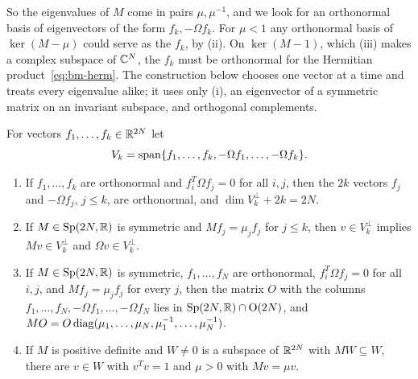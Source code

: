 \begin{vetdenv}
So the eigenvalues of $M$ come in pairs $\mu,\mu^{-1}$, and we look for an orthonormal basis of eigenvectors of the
form $f_k,-\Omega f_k$. For $\mu<1$ any orthonormal basis of $\ker(M-\mu)$ could serve as the $f_k$, by (ii). On
$\ker(M-1)$, which (iii) makes a complex subspace of $\mathbb C^N$, the $f_k$ must be orthonormal for the Hermitian
product~\eqref{eq:bm-herm}. The construction below chooses one vector at a time and treats every eigenvalue
alike; it uses only (i), an eigenvector of a symmetric matrix on an invariant subspace, and orthogonal complements.

\begin{lemma}\label{lem:bm-family}
For vectors $f_1,\ldots,f_k\in\mathbb R^{2N}$ let
\[
 V_k=\operatorname{span}\{f_1,\ldots,f_k,-\Omega f_1,\ldots,-\Omega f_k\}.
\]
\begin{enumerate}
\item[(a)] If $f_1,\ldots,f_k$ are orthonormal and $f_i^T\Omega f_j=0$ for all $i,j$, then the $2k$ vectors $f_j$ and
$-\Omega f_j$, $j\le k$, are orthonormal, and $\dim V_k^\perp+2k=2N$.
\item[(b)] If $M\in\mathrm{Sp}(2N,\mathbb R)$ is symmetric and $Mf_j=\mu_jf_j$ for $j\le k$, then $v\in V_k^\perp$ implies $Mv\in V_k^\perp$
and $\Omega v\in V_k^\perp$.
\item[(c)] If $M\in\mathrm{Sp}(2N,\mathbb R)$ is symmetric, $f_1,\ldots,f_N$ are orthonormal, $f_i^T\Omega f_j=0$ for all $i,j$, and
$Mf_j=\mu_jf_j$ for every $j$, then the matrix $O$ with the columns $f_1,\ldots,f_N,-\Omega f_1,\ldots,-\Omega f_N$ lies
in $\mathrm{Sp}(2N,\mathbb R)\cap\mathrm{O}(2N)$, and $MO=O\operatorname{diag}(\mu_1,\ldots,\mu_N,\mu_1^{-1},\ldots,\mu_N^{-1})$.
\item[(d)] If $M$ is positive definite and $W\ne0$ is a subspace of $\mathbb R^{2N}$ with $MW\subseteq W$, there are $v\in W$
with $v^Tv=1$ and $\mu>0$ with $Mv=\mu v$.
\end{enumerate}
\end{lemma}


\end{vetdenv}

